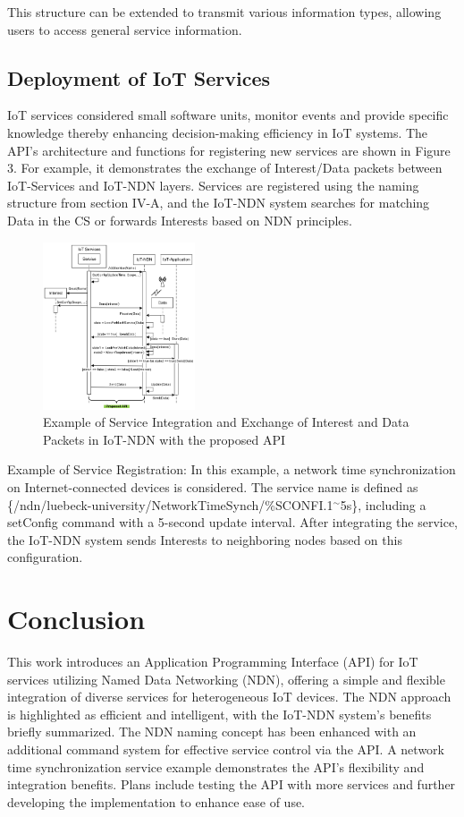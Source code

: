 \documentclass[10pt, twocolumn, journal]{IEEEtran}
\begin{document}
This structure can be extended to transmit various information types, allowing users to access general service information.

\subsection{Deployment of IoT Services}
IoT services considered small software units, monitor events and provide specific knowledge thereby enhancing decision-making efficiency in IoT systems. The API's architecture and functions for registering new services are shown in Figure 3. For example, it demonstrates the exchange of Interest/Data packets between IoT-Services and IoT-NDN layers. Services are registered using the naming structure from section IV-A, and the IoT-NDN system searches for matching Data in the CS or forwards Interests based on NDN principles.

\begin{figure}[ht]
    \centering
    \includegraphics[width=0.4\textwidth]{figure_3.png}
    \caption{Example of Service Integration and Exchange of Interest and
    Data Packets in IoT-NDN with the proposed API}
    \label{fig:figure_3}
  \end{figure}

\raggedright
\setlength{\parindent}{1em}
Example of Service Registration: In this example, a network time synchronization on Internet-connected devices is considered. The service name is defined as \{\textmd{/ndn/luebeck-university/NetworkTimeSynch/\%SCONFI.1$^{\sim}$5s}\}, including a setConfig command with a 5-second update interval. After integrating the service, the IoT-NDN system sends Interests to neighboring nodes based on this configuration. 

\section{Conclusion}
This work introduces an Application Programming Interface (API) for IoT services utilizing Named Data Networking (NDN), offering a simple and flexible integration of diverse services for heterogeneous IoT devices. The NDN approach is highlighted as efficient and intelligent, with the IoT-NDN system's benefits briefly summarized. The NDN naming concept has been enhanced with an additional command system for effective service control via the API. A network time synchronization service example demonstrates the API's flexibility and integration benefits. Plans include testing the API with more services and further developing the implementation to enhance ease of use.

\end{document}
